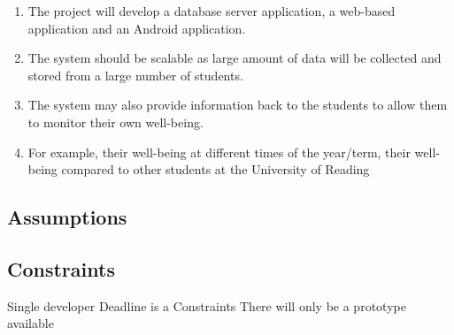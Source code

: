 \begin{enumerate}
    \item The project will develop a database server application, a web-based application and an Android application.
    \item The system should be scalable as large amount of data will be collected and stored from a large number of students. 
    \item The system may also provide information back to the students to allow them to monitor their own well-being.
    \item For example, their well-being at different times of the year/term, their well-being compared to other students at the University of Reading
\end{enumerate}


\subsection{Assumptions}


\subsection{Constraints}
Single developer
Deadline is a Constraints
There will only be a prototype available 







